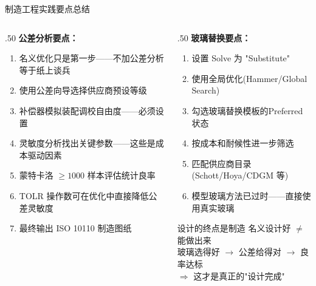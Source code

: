 \begin{frame}{制造工程实践要点总结}
    \begin{columns}[T]
        \begin{column}{.50\textwidth}
            \textbf{公差分析要点：}
            \begin{enumerate}
                \item 名义优化只是\alert{第一步}——不加公差分析等于纸上谈兵
                \item 使用\alert{公差向导}选择供应商预设等级
                \item \alert{补偿器}模拟装配调校自由度——必须设置
                \item 灵敏度分析找出\alert{关键参数}——这些是成本驱动因素
                \item 蒙特卡洛 $\ge 1000$ 样本评估\alert{统计良率}
                \item TOLR 操作数可\alert{在优化中直接降低}公差灵敏度
                \item 最终输出 ISO 10110 制造图纸
            \end{enumerate}
        \end{column}
        \hfill
        \begin{column}{.50\textwidth}
            \textbf{玻璃替换要点：}
            \begin{enumerate}
                \item 设置 Solve 为 \alert{"Substitute"}
                \item 使用\alert{全局优化}(Hammer/Global Search)
                \item 勾选玻璃替换模板的\alert{Preferred} 状态
                \item 按\alert{成本和耐候性}进一步筛选
                \item 匹配\alert{供应商目录}(Schott/Hoya/CDGM 等)
                \item 模型玻璃方法已过时——\alert{直接使用真实玻璃}
            \end{enumerate}

            \bigbreak
            \begin{block}{设计的终点是制造}
                \centering
                \alert{名义设计好 $\neq$ 能做出来}\\
                玻璃选得好 $\rightarrow$ 公差给得对 $\rightarrow$ 良率达标\\
                $\Longrightarrow$ 这才是真正的"设计完成"
            \end{block}
        \end{column}
    \end{columns}
\end{frame}

